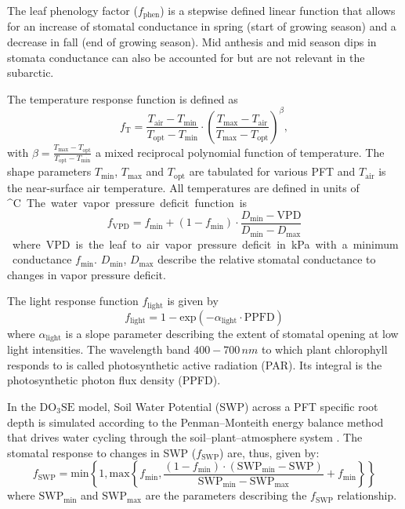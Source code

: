 \documentclass[bg, manuscript]{copernicus}
\begin{document}
The leaf phenology factor ($f_\mathrm{phen}$) is a stepwise defined linear function that allows for an increase of stomatal conductance in spring (start of growing season) and a decrease in fall (end of growing season). Mid anthesis and mid season dips in stomata conductance can also be accounted for but are not relevant in the subarctic. 

The temperature response function is defined as
%
\begin{equation}
  f_\mathrm{T} = \frac{T_\text{air}-T_\text{min}}{T_\text{opt}-T_\text{min}} \cdot \left(\frac{T_{\text{max}}-T_\text{air}}{T_{\text{max}}-T_\text{opt}}\right)^\beta,
  \label{eq:f_temp}
\end{equation}
with $\beta = \frac{T_\text{max}-T_\text{opt}}{T_\text{opt}-T_\text{min}}$ a mixed reciprocal polynomial function of temperature. The shape parameters $T_\text{min}$, $T_\text{max}$ and $T_\text{opt}$ are tabulated for various PFT and $T_\mathrm{air}$ is the near-surface air temperature. All temperatures are defined in units of \unit{^\circ C}.

The water vapor pressure deficit function is
%
\begin{equation}
  f_\mathrm{VPD} = f_\text{min}+(1-f_\text{min}) \cdot \frac{D_\text{min} - \text{VPD}}{D_\text{min}-D_\text{max}}
  \label{eq:f_vpd}
\end{equation}
%
where VPD is the leaf to air vapor pressure deficit in \unit{kPa} with a minimum conductance $f_\text{min}$. $D_\text{min}$, $D_\text{max}$ describe the relative stomatal conductance to changes in vapor pressure deficit.

The light response function $f_\mathrm{light}$ is given by
%
\begin{equation}
  f_\text{light} = 1-\text{exp}(-\alpha_\text{light}\cdot \text{PPFD})
  \label{eq:flight}
\end{equation}
%
where $\alpha_\mathrm{light}$ is a slope parameter describing the extent of stomatal opening at low light intensities. The wavelength band $400-700\,\unit{nm}$ to which plant chlorophyll responds to is called photosynthetic active radiation (PAR). Its integral is the photosynthetic photon flux density (PPFD).

In the $\mathrm{DO_3SE}$ model, Soil Water Potential (SWP) across a PFT specific root depth is simulated according to the Penman--Monteith energy balance method that drives water cycling through the soil--plant--atmosphere system \citep{ACP:Bueker2012}. The stomatal response to changes in SWP ($f_\mathrm{SWP}$) are, thus, given by:
%
\begin{equation}
  f_\mathrm{SWP} = \text{min}\left\{1, \text{max}\left\{f_\mathrm{min}, \frac{(1 - f_\mathrm{min})\cdot(\mathrm{SWP_{min}} - \mathrm{SWP})}{\mathrm{SWP_{min}} - \mathrm{SWP_{max}}} + f_\mathrm{min} \right\} \right\}
    \label{eq:fsw}
\end{equation}
%
where $\mathrm{SWP_{min}}$ and $\mathrm{SWP_{max}}$ are the parameters describing the $f_\mathrm{SWP}$ relationship.
\end{document}
